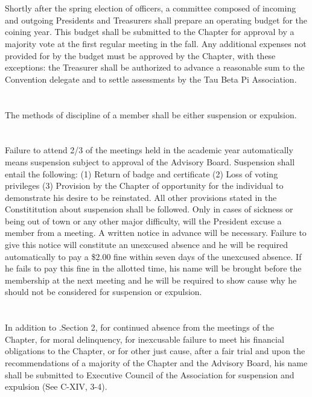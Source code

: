 \documentclass[12pt]{constitution}
\begin{document}
\section{}
Shortly after the spring election of officers, a committee composed of incoming and outgoing Presidents and Treasurers shall prepare an operating budget for the coining year. This budget shall be submitted to the Chapter for approval by a majority vote at the first regular meeting in the fall. Any additional expenses not provided for by the budget must be approved by the Chapter, with these exceptions: the Treasurer shall be
authorized to advance a reasonable sum to the Convention delegate and to settle assessments by the Tau Beta Pi Association.

\section{}
The methods of discipline of a member shall be either suspension or expulsion.
\section{}
Failure to attend 2/3 of the meetings held in the academic year automatically means suspension subject to approval of the Advisory Board. Suspension shall entail the following: (1) Return of badge and certificate (2) Loss of voting privileges (3) Provision by the Chapter of opportunity for the individual to demonstrate his desire to be reinstated. All other provisions stated in the Constititution about suspension shall be followed. Only in cases of sickness or being out of town or any other major difficulty,
will the President excuse a member from a meeting. A written notice in advance will be necessary. Failure to give this notice will constitute an unexcused absence and he will be required automatically to pay a \$2.00 fine within seven days of the unexcused absence. If he fails to pay this fine in the allotted time, his name will be brought before the membership at the next meeting and he will be required to show cause why he should not be considered for suspension or expulsion.
\section{} %
In addition to .Section 2, for continued absence from the meetings of the Chapter, for moral delinquency, for inexcusable failure to meet his financial obligations to the Chapter, or for other just cause, after a fair trial and upon the recommendations of a majority of the Chapter and the Advisory Board, his name shall be submitted to
Executive Council of the Association for suspension and expulsion (See C-XIV, 3-4).
\end{document}
